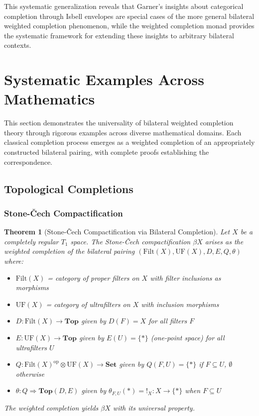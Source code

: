 \documentclass[11pt]{article}
\theoremstyle{plain}
\newtheorem{theorem}{Theorem}[section]
\theoremstyle{definition}
\theoremstyle{remark}
\newcommand{\op}{\mathrm{op}}
\begin{document}
This systematic generalization reveals that Garner's insights about categorical completion through Isbell envelopes are special cases of the more general bilateral weighted completion phenomenon, while the weighted completion monad provides the systematic framework for extending these insights to arbitrary bilateral contexts.

\section{Systematic Examples Across Mathematics}

This section demonstrates the universality of bilateral weighted completion theory through rigorous examples across diverse mathematical domains. Each classical completion process emerges as a weighted completion of an appropriately constructed bilateral pairing, with complete proofs establishing the correspondence.

\subsection{Topological Completions}

\subsubsection{Stone-\v{C}ech Compactification}

\begin{theorem}[Stone-\v{C}ech Compactification via Bilateral Completion]\label{thm:stone-cech-bilateral}
Let $X$ be a completely regular $T_1$ space. The Stone-\v{C}ech compactification $\beta X$ arises as the weighted completion of the bilateral pairing $(\mathrm{Filt}(X), \mathrm{UF}(X), D, E, Q, \theta)$ where:
\begin{itemize}
\item $\mathrm{Filt}(X)$ = category of proper filters on $X$ with filter inclusions as morphisms
\item $\mathrm{UF}(X)$ = category of ultrafilters on $X$ with inclusion morphisms  
\item $D : \mathrm{Filt}(X) \to \mathbf{Top}$ given by $D(F) = X$ for all filters $F$
\item $E : \mathrm{UF}(X) \to \mathbf{Top}$ given by $E(U) = \{*\}$ (one-point space) for all ultrafilters $U$
\item $Q : \mathrm{Filt}(X)^{\op} \otimes \mathrm{UF}(X) \to \mathbf{Set}$ given by $Q(F, U) = \{*\}$ if $F \subseteq U$, $\emptyset$ otherwise
\item $\theta : Q \Rightarrow \mathbf{Top}(D, E)$ given by $\theta_{F,U}(*) = !_X : X \to \{*\}$ when $F \subseteq U$
\end{itemize}

The weighted completion yields $\beta X$ with its universal property.
\end{theorem}
\end{document}
